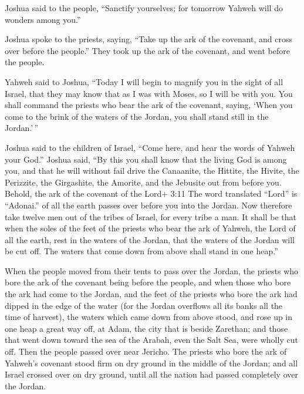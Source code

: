  Joshua said to the people, ``Sanctify yourselves; for
tomorrow Yahweh will do wonders among you.''

 Joshua spoke to the priests, saying, ``Take up the ark of
the covenant, and cross over before the people.'' They took up the ark
of the covenant, and went before the people.

 Yahweh said to Joshua, ``Today I will begin to magnify you
in the sight of all Israel, that they may know that as I was with Moses,
so I will be with you.  You shall command the priests who
bear the ark of the covenant, saying, `When you come to the brink of the
waters of the Jordan, you shall stand still in the Jordan.'\,''

 Joshua said to the children of Israel, ``Come here, and
hear the words of Yahweh your God.''  Joshua said, ``By
this you shall know that the living God is among you, and that he will
without fail drive the Canaanite, the Hittite, the Hivite, the
Perizzite, the Girgashite, the Amorite, and the Jebusite out from before
you.  Behold, the ark of the covenant of the Lord+ 3:11 The
word translated ``Lord'' is ``Adonai.'' of all the earth passes over
before you into the Jordan.  Now therefore take twelve men
out of the tribes of Israel, for every tribe a man.  It
shall be that when the soles of the feet of the priests who bear the ark
of Yahweh, the Lord of all the earth, rest in the waters of the Jordan,
that the waters of the Jordan will be cut off. The waters that come down
from above shall stand in one heap.''

 When the people moved from their tents to pass over the
Jordan, the priests who bore the ark of the covenant being before the
people,  and when those who bore the ark had come to the
Jordan, and the feet of the priests who bore the ark had dipped in the
edge of the water (for the Jordan overflows all its banks all the time
of harvest),  the waters which came down from above stood,
and rose up in one heap a great way off, at Adam, the city that is
beside Zarethan; and those that went down toward the sea of the Arabah,
even the Salt Sea, were wholly cut off. Then the people passed over near
Jericho.  The priests who bore the ark of Yahweh's covenant
stood firm on dry ground in the middle of the Jordan; and all Israel
crossed over on dry ground, until all the nation had passed completely
over the Jordan.

